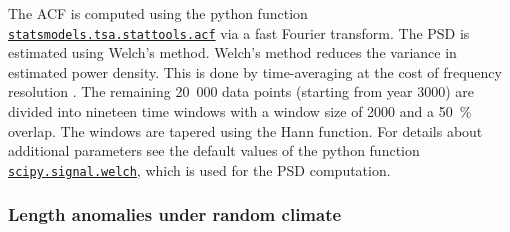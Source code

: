         The ACF is computed using the python function \href{https://www.statsmodels.org/devel/generated/statsmodels.tsa.stattools.acf.html}{\lstinline`statsmodels.tsa.stattools.acf`} via a fast Fourier transform. The PSD is estimated using Welch's method. Welch's method reduces the variance in estimated power density. This is done by time-averaging at the cost of frequency resolution \citep[e.g.,][]{Welch1967, Proakis2007}. The remaining 20\ 000 data points (starting from year 3000) are divided into nineteen time windows with a window size of 2000  and a \SI{50}{\percent} overlap. The windows are tapered using the Hann function. For details about additional parameters see the default values of the python function \href{https://docs.scipy.org/doc/scipy/reference/generated/scipy.signal.welch.html}{\lstinline`scipy.signal.welch`}, which is used for the PSD computation.
    

    \subsubsection{Length anomalies under random climate} %
    \label{ssub:length_anomalies_under_random_climate}


